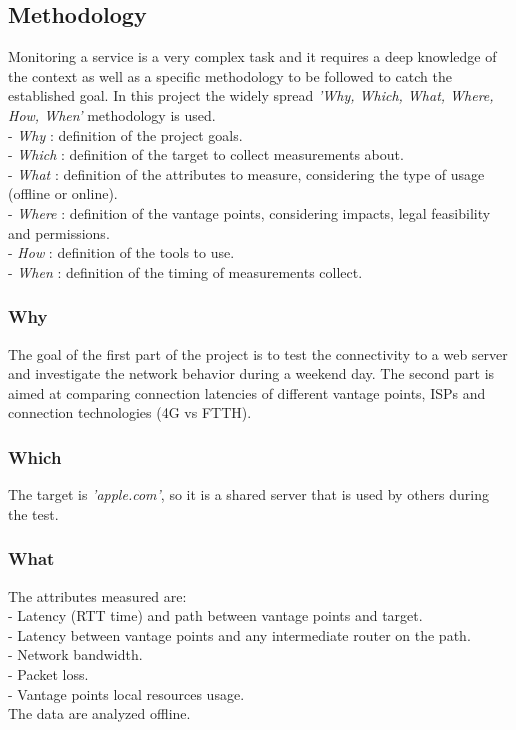 \documentclass[a4paper,10pt]{article}
\begin{document}
\begin{multicols}{2}
\subsection{Methodology}
Monitoring a service is a very complex task and it requires a deep knowledge of the context as well as a specific
methodology to be followed to catch the established goal. In this project the widely spread \textit{'Why, Which, What, Where, How, When'}
methodology is used.\\
- \textit{Why} : definition of the project goals.\\
- \textit{Which} : definition of the target to collect measurements about.\\
- \textit{What} : definition of the attributes to measure, considering the type of usage (offline or online).\\
- \textit{Where} : definition of the vantage points, considering impacts, legal feasibility and permissions.\\
- \textit{How} : definition of the tools to use.\\
- \textit{When} : definition of the timing of measurements collect.

\subsubsection*{Why}
The goal of the first part of the project is to test the connectivity to a web server and investigate the network behavior during a weekend day.
The second part is aimed at comparing connection latencies of different vantage points, ISPs and connection technologies (4G vs FTTH).

\subsubsection*{Which}
The target is \textit{'apple.com'}, so it is a shared server that is used by others during the test.

\subsubsection*{What}
The attributes measured are:  \\
- Latency (RTT time) and path between vantage points and target.\\
- Latency between vantage points and any intermediate router on the path.\\
- Network bandwidth.\\
- Packet loss.\\
- Vantage points local resources usage.\\
The data are analyzed offline.


\end{multicols}
\end{document}
